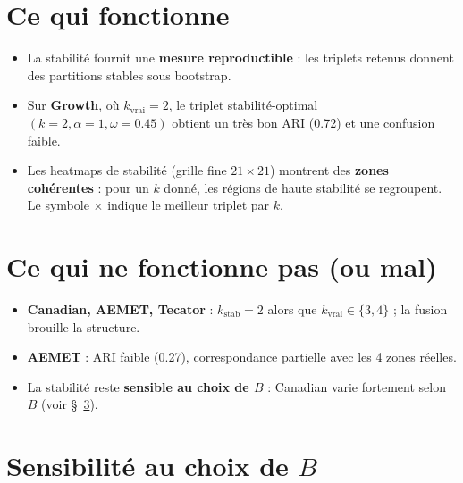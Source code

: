 \documentclass[11pt, a4paper]{article}
\begin{document}
\section{Ce qui fonctionne}

\begin{itemize}
  \item La stabilité fournit une \textbf{mesure reproductible} : les
        triplets retenus donnent des partitions stables sous bootstrap.
  \item Sur \textbf{Growth}, où $k_{\mathrm{vrai}} = 2$, le triplet
        stabilité-optimal $(k=2, \alpha=1, \omega=0.45)$ obtient un très bon
        ARI (0.72) et une confusion faible.
  \item Les heatmaps de stabilité (grille fine $21 \times 21$) montrent des
        \textbf{zones cohérentes} : pour un $k$ donné, les régions de haute
        stabilité se regroupent. Le symbole $\times$ indique le meilleur
        triplet par $k$.
\end{itemize}

\section{Ce qui ne fonctionne pas (ou mal)}

\begin{itemize}
  \item \textbf{Canadian, AEMET, Tecator} : $k_{\mathrm{stab}} = 2$ alors que
        $k_{\mathrm{vrai}} \in \{3, 4\}$ ; la fusion brouille la structure.
  \item \textbf{AEMET} : ARI faible (0.27), correspondance partielle avec les
        4 zones réelles.
  \item La stabilité reste \textbf{sensible au choix de $B$} : Canadian varie
        fortement selon $B$ (voir §~\ref{sec:sensibilite-B}).
\end{itemize}

\section{Sensibilité au choix de $B$}
\label{sec:sensibilite-B}
\end{document}
